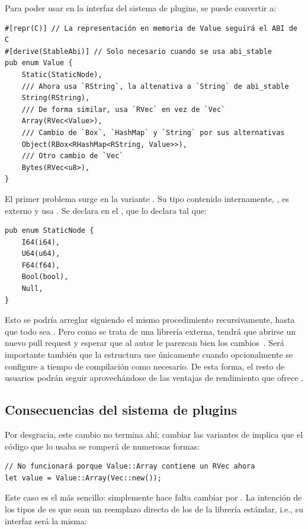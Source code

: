 Para poder usar  en la interfaz del sistema de plugins, se puede
convertir a:

\begin{verbatim}
#[repr(C)] // La representación en memoria de Value seguirá el ABI de C
#[derive(StableAbi)] // Solo necesario cuando se usa abi_stable
pub enum Value {
    Static(StaticNode),
    /// Ahora usa `RString`, la altenativa a `String` de abi_stable
    String(RString),
    /// De forma similar, usa `RVec` en vez de `Vec`
    Array(RVec<Value>),
    /// Cambio de `Box`, `HashMap` y `String` por sus alternativas
    Object(RBox<RHashMap<RString, Value>>),
    /// Otro cambio de `Vec`
    Bytes(RVec<u8>),
}
\end{verbatim}

El primer problema surge en la variante . Su tipo contenido
internamente, , es externo y usa . Se
declara en el \crate {}, que lo declara tal que:

\begin{verbatim}
pub enum StaticNode {
    I64(i64),
    U64(u64),
    F64(f64),
    Bool(bool),
    Null,
}
\end{verbatim}

Esto se podría arreglar siguiendo el mismo procedimiento recursivamente, hasta
que todo sea \rust{#[repr(C)]}. Pero como se trata de una librería externa,
tendrá que abrirse un nuevo pull request y esperar que al autor le parezcan bien
los cambios~\cite{openstaticnode}. Será importante también que la estructura use
\rust{#[repr(C)]} únicamente cuando opcionalmente se configure a tiempo de
compilación como necesario. De esta forma, el resto de usuarios podrán seguir
aprovechándose de las ventajas de rendimiento que ofrece .

\subsection{Consecuencias del sistema de plugins}

Por desgracia, este cambio no termina ahí; cambiar las variantes de 
implica que el código que lo usaba se romperá de numerosas formas:

\begin{verbatim}
// No funcionará porque Value::Array contiene un RVec ahora
let value = Value::Array(Vec::new());
\end{verbatim}

Este caso es el más sencillo: simplemente hace falta cambiar  por
. La intención de los tipos de \abistable es que sean un reemplazo
directo de los de la librería estándar, i.e., su interfaz será la misma:

